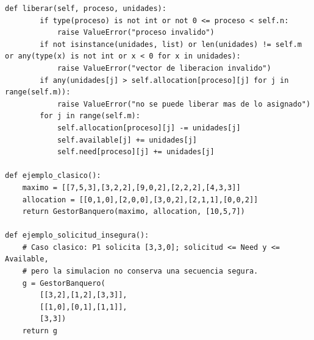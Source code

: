 \documentclass[12pt,a4paper]{article}
\begin{document}
\begin{lstlisting}[style=pycode]
    def liberar(self, proceso, unidades):
        if type(proceso) is not int or not 0 <= proceso < self.n:
            raise ValueError("proceso invalido")
        if not isinstance(unidades, list) or len(unidades) != self.m or any(type(x) is not int or x < 0 for x in unidades):
            raise ValueError("vector de liberacion invalido")
        if any(unidades[j] > self.allocation[proceso][j] for j in range(self.m)):
            raise ValueError("no se puede liberar mas de lo asignado")
        for j in range(self.m):
            self.allocation[proceso][j] -= unidades[j]
            self.available[j] += unidades[j]
            self.need[proceso][j] += unidades[j]

def ejemplo_clasico():
    maximo = [[7,5,3],[3,2,2],[9,0,2],[2,2,2],[4,3,3]]
    allocation = [[0,1,0],[2,0,0],[3,0,2],[2,1,1],[0,0,2]]
    return GestorBanquero(maximo, allocation, [10,5,7])

def ejemplo_solicitud_insegura():
    # Caso clasico: P1 solicita [3,3,0]; solicitud <= Need y <= Available,
    # pero la simulacion no conserva una secuencia segura.
    g = GestorBanquero(
        [[3,2],[1,2],[3,3]],
        [[1,0],[0,1],[1,1]],
        [3,3])
    return g

\end{lstlisting}
\end{document}
